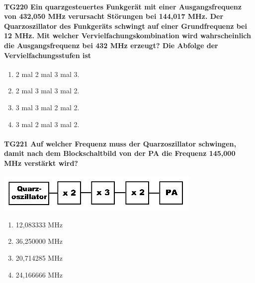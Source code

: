 \documentclass[8pt]{article}
\begin{document}
\paragraph*{TG220 Ein quarzgesteuertes Funkgerät mit einer Ausgangsfrequenz von 432,050 MHz verursacht Störungen bei 144,017 MHz. Der Quarzoszillator des Funkgeräts schwingt auf einer Grundfrequenz bei 12 MHz. Mit welcher Vervielfachungskombination wird wahrscheinlich die Ausgangsfrequenz bei 432 MHz erzeugt? Die Abfolge der Vervielfachungsstufen ist}
\begin{enumerate}[nolistsep,label=\Alph*]
\item 2 mal 2 mal 3 mal 3.
\item 2 mal 3 mal 3 mal 2.
\item 3 mal 3 mal 2 mal 2.
\item 3 mal 2 mal 3 mal 2.
\end{enumerate}

\paragraph*{TG221 Auf welcher Frequenz muss der Quarzoszillator schwingen, damit nach dem Blockschaltbild von der PA die Frequenz 145,000 MHz verstärkt wird?}
\begin{center}
	\begin{minipage}{\linewidth}
		\centering
		\includegraphics[scale=1.0]{pics/tg221_a.jpg}
	\end{minipage}
\end{center}
\begin{enumerate}[nolistsep,label=\Alph*]
\item 12,083333 MHz
\item 36,250000 MHz
\item 20,714285 MHz
\item 24,166666 MHz
\end{enumerate}
\end{document}
